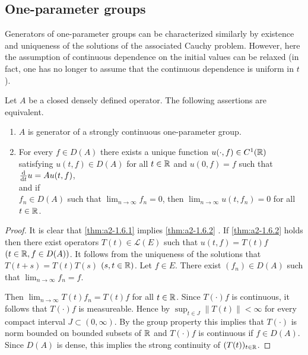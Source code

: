 \subsection{One-parameter groups} \label{subsec:a2-1.se2}
Generators of one-parameter groups can be characterized similarly by existence and uniqueness of the solutions of the associated Cauchy problem.
However, here the assumption of continuous dependence on the initial values can be relaxed (in fact, one has no longer to assume that the continuous dependence is uniform in $t$).
\begin{theorem}\label{thm:a2-1.6}
Let $A$ be a closed densely defined operator.
The following assertions are equivalent.
\begin{enumerate}[\upshape (a)]
\item \label{thm:a2-1.6.1}
$A$ is generator of a strongly continuous one-parameter group.
\item  \label{thm:a2-1.6.2}
For every $f \in D(A)$ there exists a unique function $u(\cdot,f) \in C^{1}(\mathbb{R})$ satisfying $u(t,f) \in D(A)$ for all $t \in \mathbb{R}$ and $u(0,f) = f$ such that $\frac{\mathop{}\!\mathrm{d}{}}{\mathop{}\!\mathrm{d}{t}}u = Au(t,f)$, \\
and if \\
$f_{n} \in D(A)$ such that $\lim_{n \to \infty} f_{n} = 0$, then $\lim_{n \to \infty} u(t,f_{n}) = 0$ for all $t \in \mathbb{R}$.
\end{enumerate}
\end{theorem}
\begin{proof}
It is clear that \ref{thm:a2-1.6.1}   implies \ref{thm:a2-1.6.2} . 
If \ref{thm:a2-1.6.2}   holds then there exist operators $T(t) \in \mathcal{L}(E)$ such that $u(t,f) = T(t)f$ $(t \in \mathbb{R}, f \in D(A))$.
It follows from the uniqueness of the solutions that $T(t+s) = T(t)T(s)$ $(s,t \in \mathbb{R})$.
Let $f \in E$. 
There exist $(f_{n}) \in D(A)$ such that $\lim_{n \to \infty} f_{n} = f$.

Then $\lim_{n \to \infty} T(t)f_{n} = T(t)f$ for all $t \in \mathbb{R}$.
Since $T(\cdot)f$ is continuous, it follows that $T(\cdot)f$ is measureable.
Hence by
 \citet[10.2.1]{hillephillips:1957} $\sup_{t \in J}\|T(t)\| < \infty$ for every compact interval $J \subset (0,\infty)$.
By the group property this implies that $T(\cdot)$ is norm bounded on bounded subsets of $\mathbb{R}$ and
$T(\cdot)f$ is continuous if $f \in D(A)$.
Since $D(A)$ is dense, this implies the strong continuity of $(T(t))_{t \in \mathbb{R}}$.
\end{proof}
